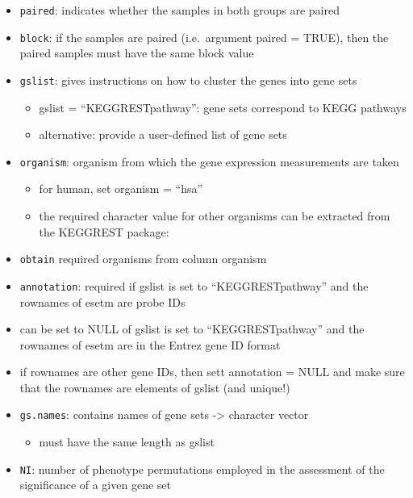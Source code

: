 \documentclass[
]{book}
\providecommand{\tightlist}{%
  \setlength{\itemsep}{0pt}\setlength{\parskip}{0pt}}
\begin{document}
\begin{itemize}
\tightlist
\item
  \texttt{paired}: indicates whether the samples in both groups are paired
\item
  \texttt{block}: if the samples are paired (i.e.~argument paired = TRUE), then the paired samples must have the same block value
\item
  \texttt{gslist}: gives instructions on how to cluster the genes into gene sets

  \begin{itemize}
  \tightlist
  \item
    gslist = ``KEGGRESTpathway'': gene sets correspond to KEGG pathways
  \item
    alternative: provide a user-defined list of gene sets
  \end{itemize}
\item
  \texttt{organism}: organism from which the gene expression measurements are taken

  \begin{itemize}
  \tightlist
  \item
    for human, set organism = ``hsa''
  \item
    the required character value for other organisms can be extracted from the KEGGREST package:
  \end{itemize}
\item
  \texttt{obtain} required organisms from column organism
\item
  \texttt{annotation}: required if gslist is set to ``KEGGRESTpathway'' and the rownames of esetm are probe IDs
\item
  can be set to NULL of gslist is set to ``KEGGRESTpathway'' and the rownames of esetm are in the Entrez gene ID format
\item
  if rownames are other gene IDs, then sett annotation = NULL and make sure that the rownames are elements of gslist (and unique!)
\item
  \texttt{gs.names}: contains names of gene sets -\textgreater{} character vector

  \begin{itemize}
  \tightlist
  \item
    must have the same length as gslist
  \end{itemize}
\item
  \texttt{NI}: number of phenotype permutations employed in the assessment of the significance of a given gene set
\end{itemize}
\end{document}
